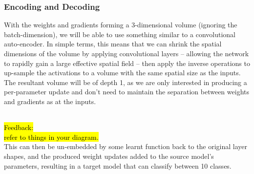 \documentclass{report}
\newcommand{\FEEDBACK}[1]{\sethlcolor{green}\hl{\\ Feedback: \\#1\\}}
\begin{document}
	\subsubsection{Encoding and Decoding}
	With the weights and gradients forming a 3-dimensional volume (ignoring the batch-dimension), we will be able to use something similar to a convolutional auto-encoder. In simple terms, this means that we can shrink the spatial dimensions of the volume by applying convolutional layers -- allowing the network to rapidly gain a large effective spatial field -- then apply the inverse operations to up-sample the activations to a volume with the same spatial size as the inputs. The resultant volume will be of depth 1, as we are only interested in producing a per-parameter update and don't need to maintain the separation between weights and gradients as at the inputs. \par
	\FEEDBACK{refer to things in your diagram.}
	This can then be un-embedded by some learnt function back to the original layer shapes, and the produced weight updates added to the source model's parameters, resulting in a target model that can classify between 10 classes.
	
\end{document}
